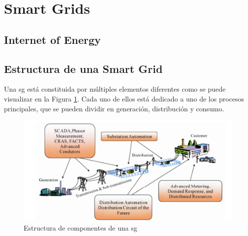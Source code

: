 \section{Smart Grids}
\label{sec:smartgrids}



\cite{repsol}
\cite{impact}


\subsection{Internet of Energy}
\cite{ioe}




\subsection{Estructura de una Smart Grid}

Una \gls{sg} está constituida por múltiples elementos diferentes como se puede visualizar en la Figura \ref{fig:estructura_sg}. Cada uno de ellos está dedicado a uno de los procesos principales, que se pueden dividir en generación, distribución y consumo. \cite{smartgrid_overview}

\vspace{0.3cm}

\begin{figure}[h]
  \centering
  \includegraphics[width=1\textwidth]{img/teoria/estructura_sg.png}
  \caption{Estructura de componentes de una \gls{sg} \cite{smartgrid_overview}}
  \label{fig:estructura_sg}
\end{figure}

